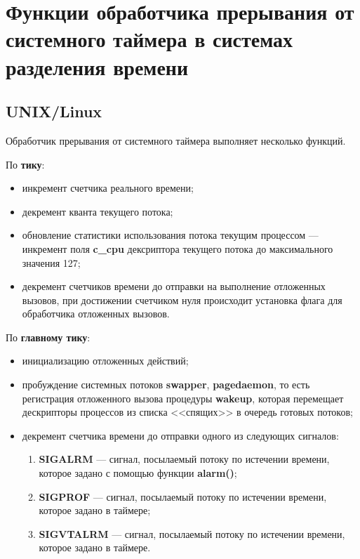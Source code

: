 \chapter{Функции обработчика прерывания от системного таймера в системах разделения времени}

\section{UNIX/Linux}

Обработчик прерывания от системного таймера выполняет несколько функций.

По \textbf{тику}:
\begin{itemize}
	\item инкремент счетчика реального времени;
	\item декремент кванта текущего потока;
	\item обновление статистики использования потока текущим процессом --- инкремент поля \textbf{c\_cpu} дексриптора текущего потока до максимального значения 127;
	\item декремент счетчиков времени до отправки на выполнение отложенных вызовов, при достижении счетчиком нуля происходит установка флага для обработчика отложенных вызовов.
\end{itemize}

По \textbf{главному тику}:
\begin{itemize}
	\item инициализацию отложенных действий;
	\item пробуждение системных потоков \textbf{swapper}, \textbf{pagedaemon}, то есть регистрация отложенного вызова процедуры \textbf{wakeup}, которая перемещает дескрипторы процессов из списка <<спящих>> в очередь готовых потоков;
	\item декремент счетчика времени до отправки одного из следующих сигналов:
	\begin{enumerate}
		\item \textbf{SIGALRM} --- сигнал, посылаемый потоку по истечении времени, которое задано с помощью функции \textbf{alarm()};
		\item \textbf{SIGPROF} --- сигнал, посылаемый потоку по истечении времени, которое задано в таймере;
		\item \textbf{SIGVTALRM} --- сигнал, посылаемый потоку по истечении времени, которое задано в таймере.
	\end{enumerate}
\end{itemize}

